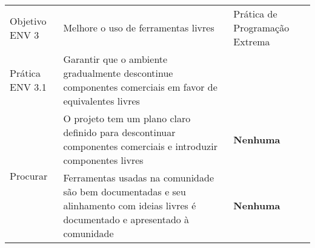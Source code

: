 \begin{longtable}{|p{2cm}|p{7cm}|p{7cm}|}
  \hline
  & & \\
  \hline \cellcolor[gray]{0.6} Objetivo ENV 3 & \cellcolor[gray]{0.6}
  Melhore o uso de ferramentas livres & Prática de Programação Extrema \\
  \hline \cellcolor[gray]{0.9} Prática ENV 3.1 & \cellcolor[gray]{0.9}
  Garantir que o ambiente gradualmente descontinue componentes
  comerciais em favor de equivalentes livres & \\
  \hline \multirow{2}{*}{Procurar} & O projeto tem um plano claro
  definido para descontinuar componentes comerciais e introduzir
  componentes livres &
  \textbf{Nenhuma} \\
  \cline{2-3} & Ferramentas usadas na comunidade são bem documentadas
  e seu alinhamento com ideias livres é documentado e apresentado à
  comunidade & \textbf{Nenhuma} \\
  \hline
\end{longtable}

